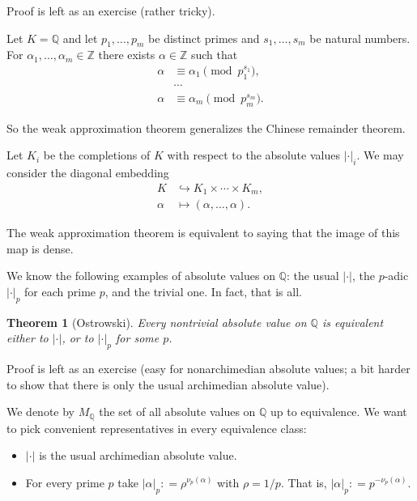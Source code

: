 \documentclass{article}
\newcommand{\dfn}{\mathrel{\mathop:}=}
\newcommand{\ZZ}{\mathbb{Z}}
\newcommand{\QQ}{\mathbb{Q}}
\newcommand{\examplesymbol}{$\blacktriangle$}
\renewcommand{\qedsymbol}{$\blacksquare$}
\theoremstyle{myplain}
\newtheorem{theorem}[proposition]{Theorem}
\theoremstyle{mydefinition}
\newenvironment{example}
  {\pushQED{\qed}\renewcommand{\qedsymbol}{\examplesymbol}\examplex}
  {\popQED\endexamplex}
\begin{document}
Proof is left as an exercise (rather tricky).

\begin{example}
  Let $K = \QQ$ and let $p_1,\ldots, p_m$ be distinct primes and
  $s_1, \ldots, s_m$ be natural numbers. For $\alpha_1,\ldots,\alpha_m \in \ZZ$
  there exists $\alpha \in \ZZ$ such that
  \begin{align*}
    \alpha & \equiv \alpha_1 \pmod{p_1^{s_1}},\\
           & \cdots \\
    \alpha & \equiv \alpha_m \pmod{p_m^{s_m}}.
  \end{align*}

  So the weak approximation theorem generalizes the Chinese remainder theorem.
\end{example}

Let $K_i$ be the completions of $K$ with respect to the absolute values
$|\cdot|_i$. We may consider the diagonal embedding
\begin{align*}
  K & \hookrightarrow K_1 \times \cdots \times K_m,\\
  \alpha & \mapsto (\alpha, \ldots, \alpha).
\end{align*}

The weak approximation theorem is equivalent to saying that the image of this
map is dense.

We know the following examples of absolute values on $\QQ$: the usual $|\cdot|$,
the $p$-adic $|\cdot|_p$ for each prime $p$, and the trivial one. In fact, that
is all.

\begin{theorem}[Ostrowski]
  Every nontrivial absolute value on $\QQ$ is equivalent either to $|\cdot|$, or
  to $|\cdot|_p$ for some $p$.
\end{theorem}

Proof is left as an exercise (easy for nonarchimedian absolute values; a bit
harder to show that there is only the usual archimedian absolute value).

\vspace{1em}

We denote by $M_\QQ$ the set of all absolute values on $\QQ$ up to
equivalence. We want to pick convenient representatives in every equivalence
class:
\begin{itemize}
\item $|\cdot|$ is the usual archimedian absolute value.

\item For every prime $p$ take $|\alpha|_p \dfn \rho^{ \nu_p (\alpha)}$ with
  $\rho = 1/p$. That is, $|\alpha|_p \dfn p^{-\nu_p(\alpha)}$.
\end{itemize}
\end{document}
